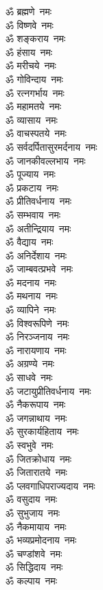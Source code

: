 \begin{multicols}{2}
\begin{flushleft}
ॐ ब्रह्मणे~नमः\\
ॐ विष्णवे~नमः\hfill{}\\
ॐ शङ्कराय~नमः\\
ॐ हंसाय~नमः\\
ॐ मरीचये~नमः\\
ॐ गोविन्दाय~नमः\\
ॐ रत्नगर्भाय~नमः\\
ॐ महामतये~नमः\\
ॐ व्यासाय~नमः\\
ॐ वाचस्पतये~नमः\\
ॐ सर्वदर्पितासुरमर्दनाय~नमः\\
ॐ जानकीवल्लभाय~नमः\hfill{}\\
ॐ पूज्याय~नमः\\
ॐ प्रकटाय~नमः\\
ॐ प्रीतिवर्धनाय~नमः\\
ॐ सम्भवाय~नमः\\
ॐ अतीन्द्रियाय~नमः\\
ॐ वैद्याय~नमः\\
ॐ अनिर्देशाय~नमः\\
ॐ जाम्बवत्प्रभवे~नमः\\
ॐ मदनाय~नमः\\
ॐ मथनाय~नमः\hfill{}\\
ॐ व्यापिने~नमः\\
ॐ विश्वरूपिणे~नमः\\
ॐ निरञ्जनाय~नमः\\
ॐ नारायणाय~नमः\\
ॐ अग्रण्ये~नमः\\
ॐ साधवे~नमः\\
ॐ जटायुप्रीतिवर्धनाय~नमः\\
ॐ नैकरूपाय~नमः\\
ॐ जगन्नाथाय~नमः\\
ॐ सुरकार्यहिताय~नमः\hfill{}\\
ॐ स्वभुवे~नमः\\
ॐ जितक्रोधाय~नमः\\
ॐ जितारातये~नमः\\
ॐ प्लवगाधिपराज्यदाय~नमः\\
ॐ वसुदाय~नमः\\
ॐ सुभुजाय~नमः\\
ॐ नैकमायाय~नमः\\
ॐ भव्यप्रमोदनाय~नमः\\
ॐ चण्डांशवे~नमः\\
ॐ सिद्धिदाय~नमः\hfill{}\\
ॐ कल्पाय~नमः\\

\end{flushleft}
\end{multicols}
